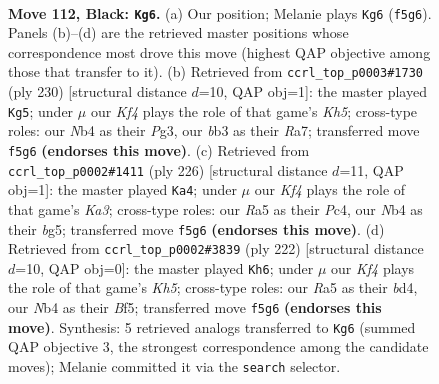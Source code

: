 \documentclass[11pt]{article}
\begin{document}
\clearpage

\begin{figure}[p]\centering
\begin{subfigure}{0.46\textwidth}\centering
\resizebox{\linewidth}{!}{%
\newchessgame
\chessboard[
  setfen={8/8/8/r4kp1/1n6/1B4K1/8/8 b - - 9 112},
  showmover=false,
  pgfstyle=straightmove, color=movearrow, markmove={f5-g6}
]}
\caption{}
\end{subfigure}\hfill
\begin{subfigure}{0.46\textwidth}\centering
\resizebox{\linewidth}{!}{%
\newchessgame
\chessboard[
  setfen={6k1/R7/6P1/7K/8/6P1/8/1r6 w - - 1 116},
  showmover=false,
  pgfstyle=straightmove, color=movearrow, markmove={h5-g5}
]}
\caption{}
\end{subfigure}
\\[4pt]
\begin{subfigure}{0.46\textwidth}\centering
\resizebox{\linewidth}{!}{%
\newchessgame
\chessboard[
  setfen={8/8/1k6/6b1/1PP5/K7/8/7B w - - 67 114},
  showmover=false,
  pgfstyle=straightmove, color=movearrow, markmove={a3-a4}
]}
\caption{}
\end{subfigure}\hfill
\begin{subfigure}{0.46\textwidth}\centering
\resizebox{\linewidth}{!}{%
\newchessgame
\chessboard[
  setfen={8/4k3/8/3P1BPK/3b4/8/8/8 w - - 83 112},
  showmover=false,
  pgfstyle=straightmove, color=movearrow, markmove={h5-h6}
]}
\caption{}
\end{subfigure}
\caption{\textbf{Move 112, Black: \texttt{Kg6}.} (a) Our position; Melanie plays \texttt{Kg6} (\texttt{f5g6}). Panels (b)--(d) are the retrieved master positions whose correspondence most drove this move (highest QAP objective among those that transfer to it). (b) Retrieved from \texttt{ccrl\_top\_p0003\#1730} (ply 230) [structural distance $d$=10, QAP obj=1]: the master played \texttt{Kg5}; under $\mu$ our \emph{Kf4} plays the role of that game's \emph{Kh5}; cross-type roles: our \emph{N}b4 as their \emph{P}g3, our \emph{b}b3 as their \emph{R}a7; transferred move \texttt{f5g6} \textbf{(endorses this move)}. (c) Retrieved from \texttt{ccrl\_top\_p0002\#1411} (ply 226) [structural distance $d$=11, QAP obj=1]: the master played \texttt{Ka4}; under $\mu$ our \emph{Kf4} plays the role of that game's \emph{Ka3}; cross-type roles: our \emph{R}a5 as their \emph{P}c4, our \emph{N}b4 as their \emph{b}g5; transferred move \texttt{f5g6} \textbf{(endorses this move)}. (d) Retrieved from \texttt{ccrl\_top\_p0002\#3839} (ply 222) [structural distance $d$=10, QAP obj=0]: the master played \texttt{Kh6}; under $\mu$ our \emph{Kf4} plays the role of that game's \emph{Kh5}; cross-type roles: our \emph{R}a5 as their \emph{b}d4, our \emph{N}b4 as their \emph{B}f5; transferred move \texttt{f5g6} \textbf{(endorses this move)}. Synthesis: 5 retrieved analogs transferred to \texttt{Kg6} (summed QAP objective 3, the strongest correspondence among the candidate moves); Melanie committed it via the \texttt{search} selector.}
\label{fig:thought-m223}
\end{figure}
\end{document}
